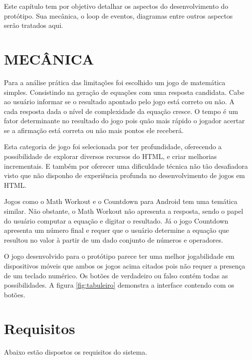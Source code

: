 Este capítulo tem por objetivo detalhar os aspectos do desenvolvimento
do protótipo. Sua mecânica, o loop de eventos, diagramas entre outros
aspectos serão tratados aqui.

\section{MECÂNICA}

Para a análise prática das limitações foi escolhido um jogo de
matemática simples. Consistindo na geração de equações com uma
resposta candidata. Cabe ao usuário informar se o resultado apontado
pelo jogo está correto ou não. A cada resposta dada o nível de
complexidade da equação cresce. O tempo é um fator determinante
no resultado do jogo pois quão mais rápido o jogador acertar se a
afirmação está correta ou não mais pontos ele receberá.

Esta categoria de jogo foi selecionada por ter profundidade, oferecendo
a possibilidade de explorar diversos recursos do HTML, e criar melhorias
incrementais. E também por oferecer uma dificuldade técnica não
tão desafiadora visto que não disponho de experiência profunda no
desenvolvimento de jogos em HTML.

Jogos como o Math Workout e o Countdown para Android tem uma temática
similar. Não obstante, o Math Workout não apresenta a resposta, sendo
o papel do usuário computar a equação e digitar o resultado. Já o jogo
Countdown apresenta um número final e requer que o usuário determine
a equação que resultou no valor à partir de um dado conjunto de
números e operadores.

O jogo desenvolvido para o protótipo parece ter uma melhor jogabilidade
em dispositivos móveis que ambos os jogos acima citados pois não
requer a presença de um teclado numérico. Os botões de verdadeiro
ou falso contém todas as possibilidades. A figura \ref{fig:tabuleiro}
demonstra a interface contendo com os botões.



\section{Requisitos}

Abaixo estão dispostos os requisitos do sistema.


